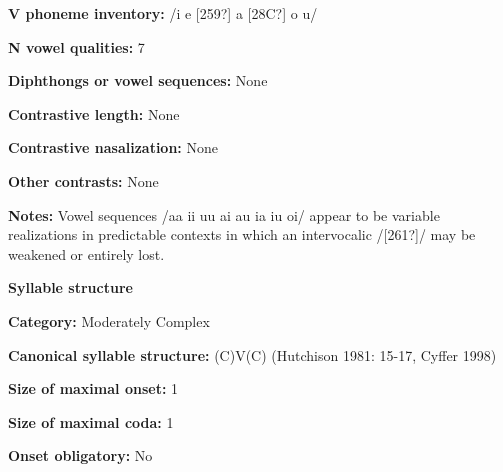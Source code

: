\begin{styleBody}
\textbf{V phoneme inventory:} /i e [259?] a [28C?] o u/
\end{styleBody}

\begin{styleBody}
\textbf{N vowel qualities:} 7
\end{styleBody}

\begin{styleBody}
\textbf{Diphthongs or vowel sequences: }None
\end{styleBody}

\begin{styleBody}
\textbf{Contrastive length:} None
\end{styleBody}

\begin{styleBody}
\textbf{Contrastive nasalization:} None
\end{styleBody}

\begin{styleBody}
\textbf{Other contrasts:} None
\end{styleBody}

\begin{styleBody}
\textbf{Notes: }Vowel sequences /aa ii uu ai au ia iu oi/ appear to be variable realizations in predictable contexts in which an intervocalic /[261?]/ may be weakened or entirely lost.
\end{styleBody}

\begin{styleBody}
\textbf{Syllable structure}
\end{styleBody}

\begin{styleBody}
\textbf{Category:} Moderately Complex
\end{styleBody}

\begin{styleBody}
\textbf{Canonical syllable structure:} (C)V(C) (Hutchison 1981: 15-17, Cyffer 1998)
\end{styleBody}

\begin{styleBody}
\textbf{Size of maximal onset:} 1
\end{styleBody}

\begin{styleBody}
\textbf{Size of maximal coda:} 1
\end{styleBody}

\begin{styleBody}
\textbf{Onset obligatory:} No
\end{styleBody}

